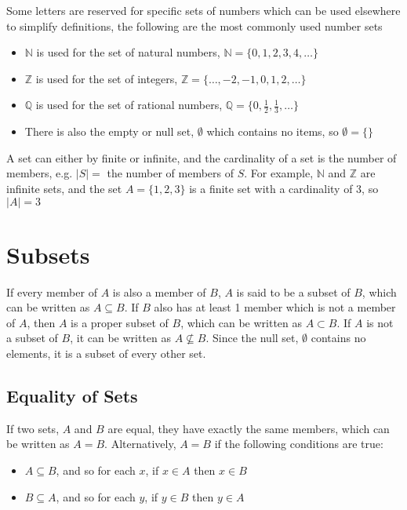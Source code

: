 Some letters are reserved for specific sets of numbers which can be used elsewhere to simplify definitions, the
 following are the most commonly used number sets
\begin{itemize}
  \item $\mathbb{N}$ is used for the set of natural numbers, $\mathbb{N} = \{0, 1, 2, 3, 4, \dots\}$
  \item $\mathbb{Z}$ is used for the set of integers, $\mathbb{Z} = \{\dots, -2, -1, 0, 1, 2, \dots\}$
  \item $\mathbb{Q}$ is used for the set of rational numbers, $\mathbb{Q} = \{0, \frac{1}{2}, \frac{1}{3}, \dots\}$
  \item There is also the empty or null set, $\emptyset$ which contains no items, so $\emptyset = \{\}$
\end{itemize}

A set can either by finite or infinite, and the cardinality of a set is the number of members, e.g. $\lvert S \rvert = $
 the number of members of $S$. For example, $\mathbb{N}$ and $\mathbb{Z}$ are infinite sets, and the set
 $A = \{1, 2, 3\}$ is a finite set with a cardinality of 3, so $\lvert A \rvert = 3$

\section*{Subsets}

If every member of $A$ is also a member of $B$, $A$ is said to be a subset of $B$, which can be written as
 $A \subseteq B$. If $B$ also has at least 1 member which is not a member of $A$, then $A$ is a proper subset of $B$,
 which can be written as $A \subset B$. If $A$ is not a subset of $B$, it can be written as $A \nsubseteq B$. Since the
 null set, $\emptyset$ contains no elements, it is a subset of every other set.

\subsection*{Equality of Sets}

If two sets, $A$ and $B$ are equal, they have exactly the same members, which can be written as $A = B$. Alternatively,
 $A = B$ if the following conditions are true:
\begin{itemize}
  \item $A \subseteq B$, and so for each $x$, if $x \in A$ then $x \in B$
  \item $B \subseteq A$, and so for each $y$, if $y \in B$ then $y \in A$
\end{itemize}

